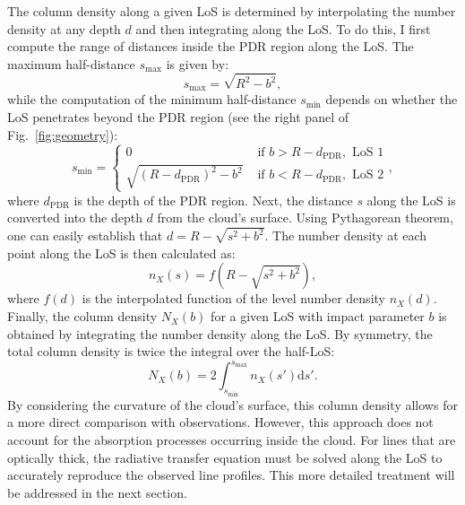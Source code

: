 \documentclass[12pt,a4paper]{article}
\newcommand{\mr}{\mathrm}
\newcommand{\dd}[1]{\mathrm{d}#1}
\begin{document}
The column density along a given LoS is determined by interpolating the number density at any depth $d$ and then integrating along the LoS. To do this, I first compute the range of distances inside the PDR region along the LoS. The maximum half-distance $s_{\max}$ is given by:
\begin{equation}
    s_{\max} = \sqrt{R^2 - b^2},
\end{equation}
while the computation of the minimum half-distance $s_{\min}$ depends on whether the LoS penetrates beyond the PDR region (see the right panel of Fig.~\ref{fig:geometry}):
\begin{equation}
    s_{\min} = \left\{\begin{array}{ll}
       0  &  \text{ if } b > R - d_\mr{PDR}, \text{ LoS 1} \\
       \sqrt{(R - d_\mr{PDR})^2 - b^2}  &  \text{ if } b < R - d_\mr{PDR}, \text{ LoS 2}
    \end{array}\right.,
\end{equation}
where $d_\mr{PDR}$ is the depth of the PDR region. Next, the distance $s$ along the LoS is converted into the depth $d$ from the cloud's surface. Using Pythagorean theorem, one can easily establish that $d = R - \sqrt{s^2 + b^2}$. The number density at each point along the LoS is then calculated as:
\begin{equation}
    n_X(s) = f(R - \sqrt{s^2 + b^2}),
\end{equation}
where $f(d)$ is the interpolated function of the level number density $n_X(d)$. Finally, the column density $N_X(b)$ for a given LoS with impact parameter $b$ is obtained by integrating the number density along the LoS. By symmetry, the total column density is twice the integral over the half-LoS: 
\begin{equation}
    N_X(b) = 2\int_{s_{\min}}^{s_{\max}} n_X(s') \dd{s'}.
\end{equation}
By considering the curvature of the cloud's surface, this column density allows for a more direct comparison with observations. However, this approach does not account for the absorption processes occurring inside the cloud. For lines that are optically thick, the radiative transfer equation must be solved along the LoS to accurately reproduce the observed line profiles. This more detailed treatment will be addressed in the next section.
\end{document}
